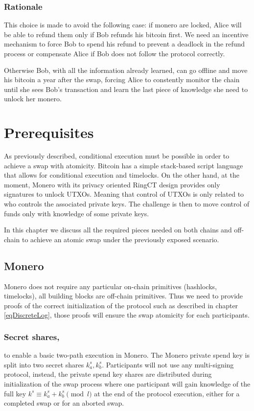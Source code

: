\documentclass{llncs}
\begin{document}
\subsubsection{Rationale}
\label{worstCaseRationale}
This choice is made to avoid the following case: if monero are locked, Alice will be able to refund them only if Bob refunds his bitcoin first. We need an incentive mechanism to force Bob to spend his refund to prevent a deadlock in the refund process or compensate Alice if Bob does not follow the protocol correctly.

Otherwise Bob, with all the information already learned, can go offline and move his bitcoin a year after the swap, forcing Alice to constently monitor the chain until she sees Bob's transaction and learn the last piece of knowledge she need to unlock her monero.

\section{Prerequisites}
\label{prerequisites}
As previously described, conditional execution must be possible in order to achieve a swap with atomicity. Bitcoin has a simple stack-based script language that allows for conditional execution and timelocks. On the other hand, at the moment, Monero with its privacy oriented RingCT design provides only signatures to unlock UTXOs. Meaning that control of UTXOs is only related to who controls the associated private keys. The challenge is then to move control of funds only with knowledge of some private keys.

In this chapter we discuss all the required pieces needed on both chains and off-chain to achieve an atomic swap under the previously exposed scenario.

\subsection{Monero}
Monero does not require any particular on-chain primitives (hashlocks, timelocks), all building blocks are off-chain primitives. Thus we need to provide proofs of the correct initialization of the protocol such as described in chapter \ref{eqDiscreteLog}, those proofs will ensure the swap atomicity for each participants.

\subsubsection{Secret shares,}
to enable a basic two-path execution in Monero. The Monero private spend key is split into two secret shares $k^s_a, k^s_b$. Participants will not use any multi-signing protocol, instead, the private spend key shares are distributed during initialization of the swap process where one participant will gain knowledge of the full key $k^s \equiv k^s_a + k^s_b \pmod l$ at the end of the protocol execution, either for a completed swap or for an aborted swap.
\end{document}
